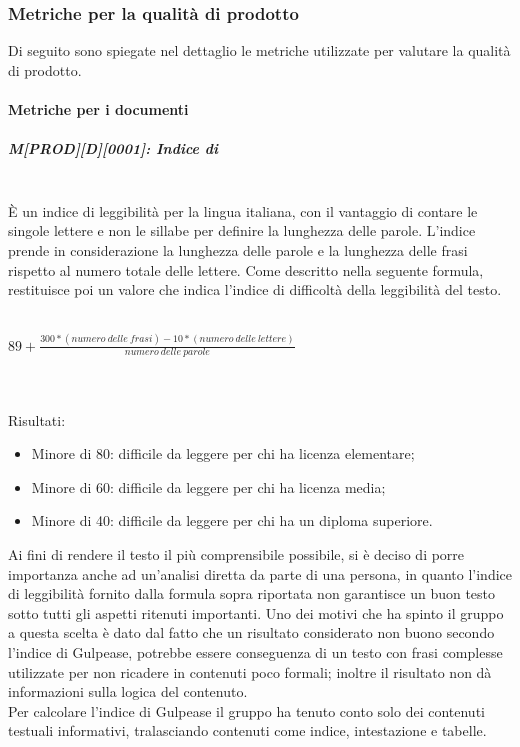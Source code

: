 \subsubsection{Metriche per la qualità di prodotto}
Di seguito sono spiegate nel dettaglio le metriche utilizzate per valutare la qualità di prodotto.

\paragraph{Metriche per i documenti}
\subparagraph{M[PROD][D][0001]: Indice di }
~\\È un indice di leggibilità per la lingua italiana, con il vantaggio di contare le singole lettere e non le sillabe per definire la lunghezza delle parole. 
L'indice prende in considerazione la lunghezza delle parole e la lunghezza delle frasi rispetto al numero totale delle lettere. Come descritto nella seguente formula, restituisce poi un valore che indica l'indice di difficoltà della leggibilità del testo.
\\\\
\centerline{ ${\displaystyle 89+{\frac {300*(numero\ delle\ frasi)-10*(numero\ delle\ lettere)}{numero\ delle\ parole}}}$}
\\\\ Risultati:
\begin{itemize}
    \item Minore di 80: difficile da leggere per chi ha licenza elementare;
    \item Minore di 60: difficile da leggere per chi ha licenza media;
    \item Minore di 40: difficile da leggere per chi ha un diploma superiore.
    \end{itemize}
Ai fini di rendere il testo il più comprensibile possibile, si è deciso di porre importanza anche ad un'analisi diretta da parte di una persona, in quanto l'indice di leggibilità fornito dalla formula sopra riportata non garantisce un buon testo sotto tutti gli aspetti ritenuti importanti. Uno dei motivi che ha spinto il gruppo a questa scelta è dato dal fatto che un risultato considerato non buono secondo l'indice di Gulpease, potrebbe essere conseguenza di un testo con frasi complesse utilizzate per non ricadere in contenuti poco formali; inoltre il risultato non dà informazioni sulla logica del contenuto.\\
Per calcolare l'indice di Gulpease il gruppo ha tenuto conto solo dei contenuti testuali informativi, tralasciando contenuti come indice, intestazione e tabelle.

